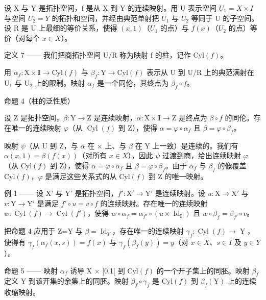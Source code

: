 设 X 与 Y 是拓扑空间，f 是从 X 到 Y 的连续映射。用 U 表示空间 \(U_{1} = X \times I\) 与空间 \(U_{2} = Y\) 的拓扑和空间，并经由典范单射把 \(U_{1}\) 与 \(U_{2}\) 等同于 U 的子空间。设 R 是 U 上最细的等价关系，使得 \((x,1)\)（\(U_{1}\) 的点）与 \(f(x)\)（\(U_{2}\) 的点）等价（对每个 \(x \in X\)）。

定义 7 —— 我们把商拓扑空间 U/R 称为映射 f 的柱，记作 \(\mathrm{Cyl}(f)\)。

用 \(\alpha_{f}\colon\mathrm{X}\times\mathbf{I}\to\mathrm{Cyl}(f)\) 与 \(\beta_{f}\colon\mathrm{Y}\to\mathrm{Cyl}(f)\) 表示从 U 到 U/R 上的典范满射在 \(\mathrm{U}_{1}\) 与 \(\mathrm{U}_{2}\) 上的限制。映射 \(\alpha_{f}\) 是一个同伦，其终点为 \(\beta_{f}\circ f\)。

命题 4（柱的泛性质）

设 Z 是拓扑空间，\(\beta: \mathrm{Y} \to \mathrm{Z}\) 是连续映射，\(\alpha: \mathrm{X} \times \mathbf{I} \to \mathrm{Z}\) 是终点为 \(\beta \circ f\) 的同伦。存在唯一的连续映射 \(\varphi\)（从 \(\operatorname{Cyl}(f)\) 到 Z），使得 \(\alpha = \varphi \circ \alpha_f\) 且 \(\beta = \varphi \circ \beta_f\)。

映射 \(\psi\)（从 U 到 Z，与 \(\alpha\) 在 \(\times\) 上、与 \(\beta\) 在 Y 上一致）是连续的。我们有 \(\alpha(x,1)=\beta(f(x))\)（对所有 \(x\in X\)），因此 \(\psi\) 过渡到商，给出连续映射 \(\varphi\)（从 \(\mathrm{Cyl}(f)\) 到 Z），使得 \(\alpha=\varphi\circ\alpha_{f}\) 且 \(\beta=\varphi\circ\beta_{f}\)。由于 \(\alpha_{f}\) 与 \(\beta_{f}\) 的像覆盖 \(\mathrm{Cyl}(f)\)，\(\varphi\) 是满足这些关系式的从 \(\mathrm{Cyl}(f)\) 到 Z 的唯一映射。

例 1 —— 设 X' 与 Y' 是拓扑空间，\(f': \mathrm{X}' \to \mathrm{Y}'\) 是连续映射。设 \(u: \mathrm{X} \to \mathrm{X}'\) 与 \(v: \mathrm{Y} \to \mathrm{Y}'\) 是满足 \(f' \circ u = v \circ f\) 的连续映射。存在唯一的连续映射 \(w: \operatorname{Cyl}(f) \to \operatorname{Cyl}(f')\)，使得 \(w \circ \alpha_f = \alpha_{f'} \circ (u \times \operatorname{Id}_\mathbf{I})\) 且 \(w \circ \beta_f = \beta_{f'} \circ v\)。

把命题 4 应用于 Z=Y 与 \(\beta = \operatorname{Id}_{Y}\)，存在唯一的连续映射 \(\gamma_{f}\colon\operatorname{Cyl}(f)\to\operatorname{Y}\)，使得有 \(\gamma_{f}(\alpha_{f}(x,s))=f(x)\) 与 \(\gamma_{f}(\beta_{f}(y))=y\)（对 \(x\in X\)、\(s\in I\) 及 \(y\in Y\)）。

命题 5 —— 映射 \(\alpha_{f}\) 诱导 X × {[}0,1{[} 到 \(\mathrm{Cyl}(f)\) 的一个开子集上的同胚。映射 \(\beta_{f}\) 定义 Y 到该开集的余集上的同胚。映射 \(\beta_{f} \circ \gamma_{f}\) 是 \(\mathrm{Cyl}(f)\) 到 \(\beta_{f}(\mathrm{Y})\) 上的连续收缩映射。


